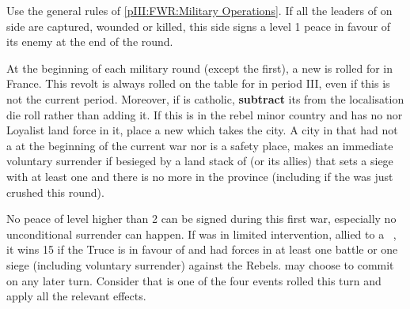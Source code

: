 \begin{digressions}



  \phmil
  \aparag Use the general rules of \ref{pIII:FWR:Military Operations}.
  \aparag If all the leaders of on side are captured, wounded or killed, this
  side signs a level 1 peace in favour of its enemy at the end of the round.

  \aparag At the beginning of each military round (except the first), a new
  \REVOLT is rolled for in France.
  \bparag This revolt is always rolled on the table for \FRA in period III,
  even if this is not the current period. Moreover, if \FRA is catholic,
  \textbf{subtract} its \STAB from the localisation die roll rather than
  adding it.
  \bparag If this \REVOLT is in the rebel minor country and has no \REVOLT nor
  Loyalist land force in it, place a new \REVOLT \facemoins which takes the
  city.
  \aparag A city in \FRA that had not a \REVOLT \faceplus at the beginning of
  the current war nor is a safety place, makes an immediate voluntary
  surrender if besieged by a land stack of \FRA (or its allies) that sets a
  siege with at least one \ARMY \faceplus and there is no more \REVOLT in the
  province (including if the \REVOLT was just crushed this round).



  \phpaix
  \aparag No peace of level higher than 2 can be signed during this first war,
  especially no unconditional surrender can happen.
  \aparag If \LIG was in limited intervention, allied to a \CATHCR\ \FRA, it
  wins 15 \PV if the Truce is in favour of \FRA and \LIG had forces in at
  least one battle or one siege (including voluntary surrender) against the
  Rebels.
  \aparag \FRA may choose to commit  on any
  later turn. Consider that  is one of the four
  events rolled this turn and apply all the relevant effects.





\end{digressions}
